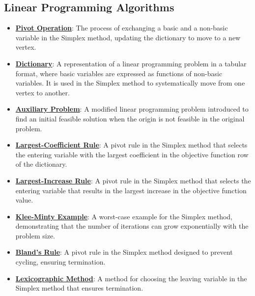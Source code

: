\documentclass{article}%
\begin{document}
\subsection{Linear Programming Algorithms}%
\label{subsec:LinearProgrammingAlgorithms}%
\begin{itemize}[leftmargin=*]%
\item \href{https://www.math.purdue.edu/~yipn/421//2024-08-27-ExSimplex.pdf#page=9}{\textbf{Pivot Operation}}: The process of exchanging a basic and a non-basic variable in the Simplex method, updating the dictionary to move to a new vertex.%
\item \href{https://www.math.purdue.edu/~yipn/421//2024-08-27-ExSimplex.pdf#page=26}{\textbf{Dictionary}}: A representation of a linear programming problem in a tabular format, where basic variables are expressed as functions of non-basic variables.  It is used in the Simplex method to systematically move from one vertex to another.%
\item \href{https://www.math.purdue.edu/~yipn/421//2024-08-27-ExSimplex.pdf#page=32}{\textbf{Auxiliary Problem}}: A modified linear programming problem introduced to find an initial feasible solution when the origin is not feasible in the original problem.%
\item \href{https://www.math.purdue.edu/~yipn/421//2024-09-05-SimplexEfficiency.pdf#page=4}{\textbf{Largest-Coefficient Rule}}: A pivot rule in the Simplex method that selects the entering variable with the largest coefficient in the objective function row of the dictionary.%
\item \href{https://www.math.purdue.edu/~yipn/421//2024-09-05-SimplexEfficiency.pdf#page=6}{\textbf{Largest-Increase Rule}}: A pivot rule in the Simplex method that selects the entering variable that results in the largest increase in the objective function value.%
\item \href{https://www.math.purdue.edu/~yipn/421//2024-09-05-SimplexEfficiency.pdf#page=2}{\textbf{Klee-Minty Example}}: A worst-case example for the Simplex method, demonstrating that the number of iterations can grow exponentially with the problem size.%
\item \href{https://www.math.purdue.edu/~yipn/421//2024-09-05-SimplexEfficiency.pdf#page=10}{\textbf{Bland's Rule}}: A pivot rule in the Simplex method designed to prevent cycling, ensuring termination.%
\item \href{https://www.math.purdue.edu/~yipn/421//2024-09-05-SimplexEfficiency.pdf#page=10}{\textbf{Lexicographic Method}}: A method for choosing the leaving variable in the Simplex method that ensures termination.%

\end{itemize}
\end{document}
